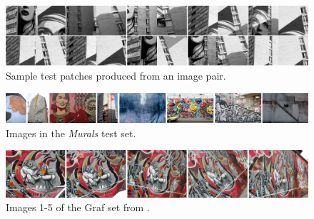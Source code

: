\documentclass[conference]{IEEEtran}
\begin{document}
\begin{figure}[htb]
			\centering
			\includegraphics[width=\columnwidth]{images/crop_examples}
	\caption{Sample test patches produced from an image pair.}
	\label{fig:fairey}
\end{figure}

\begin{figure}[t]
	\centering
	\includegraphics[width=\textwidth]{images/murals}
	\caption{Images in the \emph{Murals} test set.}
	\label{fig:murals}
\end{figure}

\begin{figure}[htb]
	\centering
	\includegraphics[width=\columnwidth]{images/graf12345.jpg}
	\caption{Images 1-5 of the Graf set from \cite{mikolajczyk2005performance}.}
	\label{fig:Graf}
\end{figure}


\end{document}

